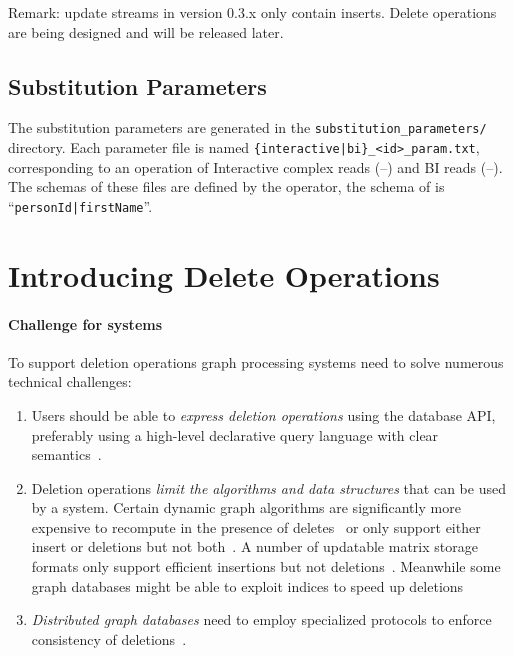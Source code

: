 Remark: update streams in version 0.3.x only contain inserts. Delete operations are being designed and will be released later.

\subsection{Substitution Parameters}

The substitution parameters are generated in the \texttt{substitution\_parameters/} directory.
Each parameter file is named \texttt{\{interactive|bi\}\_<id>\_param.txt}, corresponding to an operation of
Interactive complex reads (--) and
BI reads (--).
The schemas of these files are defined by the operator, \eg the schema of  is ``\texttt{personId|firstName}''.


\section{Introducing Delete Operations}

\paragraph{Challenge for systems}
To support deletion operations graph processing systems need to solve numerous technical challenges:
%
\begin{enumerate}
\item Users should be able to \emph{express deletion operations} using the database API, preferably using a high-level declarative query language with clear semantics~\cite{Green2019}.
\item Deletion operations \emph{limit the algorithms and data structures} that can be used by a system. Certain dynamic graph algorithms are significantly more expensive to recompute in the presence of deletes~\cite{DBLP:conf/soda/Roditty13} or only support either insert or deletions but not both~\cite{DBLP:conf/esa/RodittyZ04}. A number of updatable matrix storage formats only support efficient insertions but not deletions~\cite{DBLP:conf/hpec/BusatoGBB18}. Meanwhile some graph databases might be able to exploit indices to speed up deletions~\cite[Sec.~4.4.2]{Besta2019}
\item \emph{Distributed graph databases} need to employ specialized protocols to enforce consistency of deletions~\cite{Waudby2020}.
\end{enumerate}

